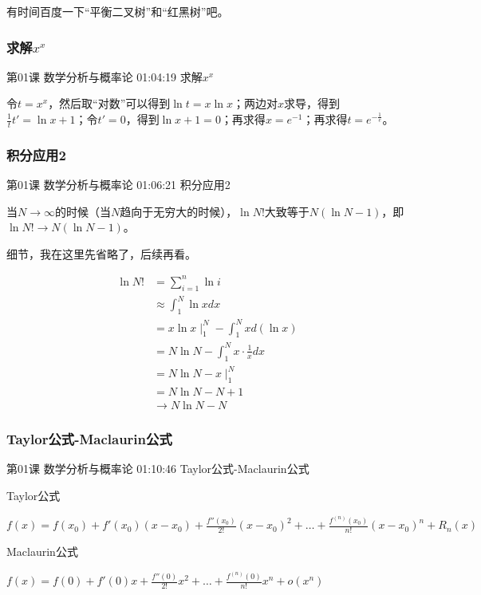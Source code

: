 \documentclass[UTF8]{ctexbook}
\begin{document}
有时间百度一下“平衡二叉树”和“红黑树”吧。

\subsubsection{求解$x^{x}$}

第01课 数学分析与概率论 01:04:19 求解$x^{x}$

令$t=x^{x}$，然后取“对数”可以得到$\ln t = x \ln x$；两边对$x$求导，得到$\frac{1}{t}t'=\ln x + 1$；令$t'=0$，得到$\ln x + 1 = 0$；再求得$x=e^{-1}$；再求得$t=e^{-\frac{1}{e}}$。

\subsubsection{积分应用2}

第01课 数学分析与概率论 01:06:21 积分应用2

当$N \rightarrow \infty$的时候（当$N$趋向于无穷大的时候），$\ln N!$大致等于$N(\ln{N}-1)$，即$\ln{N!} \rightarrow  N(\ln{N}-1)$。

细节，我在这里先省略了，后续再看。

\begin{equation}
\begin{aligned}
\ln{N!}&=\sum_{i=1}^{n} \ln{i} \\
&\approx \int_{1}^{N} \ln {xdx} \\
&=x\ln x \mid_{1}^{N}-\int_{1}^{N} xd(\ln x)\\
&=N\ln N - \int_{1}^{N} x\cdot \frac{1}{x}dx \\
&=N\ln N - x\mid_{1}^{N} \\
&=N\ln N - N + 1 \\
&\rightarrow N\ln N - N
\end{aligned}
\end{equation}

\subsubsection{Taylor公式-Maclaurin公式}

第01课 数学分析与概率论 01:10:46 Taylor公式-Maclaurin公式

Taylor公式

$f(x)=f(x_{0})+f'(x_{0})(x-x_{0})+\frac{f''(x_{0})}{2!}(x-x_{0})^{2}+\dots+\frac{f^{(n)}(x_{0})}{n!}(x-x_{0})^{n}+R_{n}(x)$

Maclaurin公式

$f(x)=f(0)+f'(0)x+\frac{f''(0)}{2!}x^{2}+\dots+\frac{f^{(n)}(0)}{n!}x^{n}+o(x^{n})$
\end{document}
